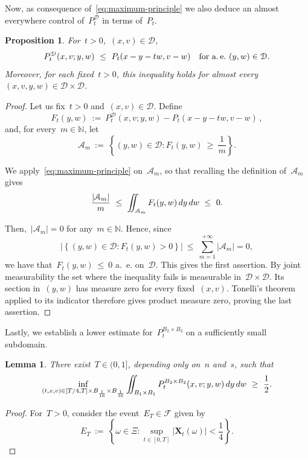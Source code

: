 \documentclass[leqno,10pt]{amsart}
\theoremstyle{plain}
\newtheorem{prop}{Proposition}[section]
\newtheorem{lemma}{Lemma}[section]
\theoremstyle{remark}
\numberwithin{equation}{section}
\def \d{\,{\rm d}}
\def\en{\mathbb{N}}
\newcommand{\Ac}{\mathcal{A}}
\newcommand{\Xb}{\boldsymbol{X}}
\begin{document}
{Now, as consequence of~\eqref{eq:maximum-principle} we also deduce an almost everywhere control of~$P^{\mathcal{D}}_t$ in terms of~$P_t$.

\begin{prop}\label{prop:ae-max-principle}
   For~$t>0$,~$(x,v)\in\mathcal{D}$, 
  \[
  P_t^{\mathcal{D}}(x,v;y,w) \ \leq\ P_t(x-y-tw,v-w) \quad \text{for a.~\!e.}~(y,w) \in \mathcal{D}.
  \]
Moreover, for each fixed~$t>0$, this inequality holds for almost every
$(x,v,y,w)\in\mathcal{D}\times\mathcal{D}$.
\end{prop}

\begin{proof}
Let us fix~$t>0$ and~$(x,v)\in\mathcal{D}$. Define
\[ 
F_t(y,w) \ := \ P_t^{\mathcal{D}}(x,v;y,w)
- P_t(x-y-tw,v-w)\,,
\]
and, for every~$m\in\mathbb{N}$, let 
\[
\mathcal{A}_m \ := \ 
\left\{(y,w)\in\mathcal{D}: F_t(y,w)\ \geq\ \frac{1}{m}\right\}.
\]

We apply~\eqref{eq:maximum-principle} on~$\mathcal{A}_m$, so that recalling the definition of~$\Ac_m$ gives
\[
\frac{|\Ac_m|}{m} \ \leq\ \iint_{\mathcal{A}_m}F_t(y,w)\d y\d w \ \leq\ 0.
\]

Then,~$|\Ac_m|=0$ for any~$m \in \en$. Hence, since
\[
|\left\{(y,w)\in\mathcal{D}:F_t(y,w)>0\right\}|
 \ \leq\ \sum_{m=1}^{+\infty}|\mathcal{A}_m|=0,
\]
we have that~$F_t(y,w)\ \leq\  0$ a.~\!e. on~$\mathcal{D}$. This gives the first assertion. By joint measurability the set where the
inequality fails is measurable in~$\mathcal{D}\times\mathcal{D}$.
Its section in~$(y,w)$ has measure zero for every fixed~$(x,v)$.
Tonelli's theorem applied to its indicator therefore gives product
measure zero, proving the last assertion.
\end{proof}


Lastly, we establish a lower estimate for~$P_t^{B_2\times B_2}$ on a sufficiently small subdomain.

\begin{lemma}\label{psharp:lem_kernel_mass}
There exist~$T \in (0,1]$, depending only on~$n$ and~$s$, such that
\begin{equation}\label{psharp:eq_kernel_mass}
\inf_{(t,x,v)\in [T/4,T]\times B_{\frac{1}{16}}\times B_{\frac{1}{16}}}\iint_{B_1\times B_1}
P_t^{B_2\times B_2}(x,v;y,w)\d y\d w \ \geq\ \frac{1}{2}.
\end{equation}
\end{lemma}

\begin{proof}
For~$T>0$, consider the event~$E_T \in \mathcal{F}$ given by
\[
E_T \ := \ 
\left\{\omega\in\Xi:
\sup_{t\in[0,T]}|\Xb_t(\omega)|<\frac14
\right\}.
\]



\end{proof}}
\end{document}
